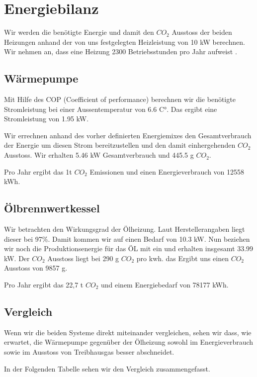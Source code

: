 \chapter{Energiebilanz}
\label{chap:bilanz}

Wir werden die benötigte Energie und damit den $CO_2$ Ausstoss der beiden
Heizungen anhand der von uns festgelegten Heizleistung von 10 kW berechnen.
Wir nehmen an, dass eine Heizung 2300 Betriebsstunden pro Jahr aufweist
\cite{heizung:heizung}.

\section{Wärmepumpe}

Mit Hilfe des COP (Coefficient of performance) berechnen wir die benötigte Stromleistung bei einer
Aussentemperatur von 6.6 C°.
Das ergibt eine Stromleistung von 1.95 kW.

Wir errechnen anhand des vorher definierten Energiemixes den Gesamtverbrauch
der Energie um diesen Strom bereitzustellen und den damit einhergehenden $CO_2$
Ausstoss.
Wir erhalten 5.46 kW Gesamtverbrauch und 445.5 g $CO_2$.

Pro Jahr ergibt das 1t $CO_2$ Emissionen und einen Energieverbrauch von 12558 kWh.

\section{Ölbrennwertkessel}

Wir betrachten den Wirkungsgrad der Ölheizung.
Laut Herstellerangaben liegt dieser bei 97\%.
Damit kommen wir auf einen Bedarf von 10.3 kW.
Nun beziehen wir noch die Produktionsenergie für das ÖL mit ein und erhalten
insgesamt 33.99 kW.
Der $CO_2$ Ausstoss liegt bei 290 g $CO_2$ pro kwh.\cite{heizung:co2vergleich}
das Ergibt uns einen $CO_2$ Ausstoss von 9857 g.

Pro Jahr ergibt das 22,7 t $CO_2$ und einem Energiebedarf von 78177 kWh.


\section{Vergleich}

Wenn wir die beiden Systeme direkt miteinander vergleichen, sehen wir dass,
wie erwartet, die Wärmepumpe gegenüber der Ölheizung
sowohl im Energieverbrauch sowie im Ausstoss von Treibhausgas besser abschneidet.

In der Folgenden Tabelle sehen wir den Vergleich zusammengefasst.

